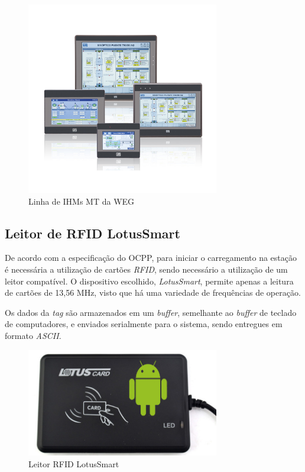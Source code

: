       \begin{figure}[H]
        \begin{center}
          \includegraphics[width=0.75\textwidth,natwidth=400,natheight=288]{assets/images/devices-hmi.jpg}
          \caption{Linha de IHMs MT da WEG}
          \label{fig:ihm}
        \end{center}
      \end{figure}

    \subsection{Leitor de RFID LotusSmart}
    \label{methodology:devices:rfid}

      De acordo com a especificação do \ac{OCPP}, para iniciar o carregamento na estação é necessária a utilização de cartões \textit{\ac{RFID}}, sendo necessário a utilização de um leitor compatível. O dispositivo escolhido, \textit{LotusSmart}, permite apenas a leitura de cartões de 13,56 MHz, visto que há uma variedade de frequências de operação.

      Os dados da \textit{tag} são armazenados em um \textit{buffer}, semelhante ao \textit{buffer} de teclado de computadores, e enviados serialmente para o sistema, sendo entregues em formato \textit{ASCII}.

      \begin{figure}[H]
        \begin{center}
          \includegraphics[width=0.75\textwidth,natwidth=655,natheight=368]{assets/images/devices-rfid.jpg}
          \caption{Leitor RFID LotusSmart}
          \label{fig:rfid}
        \end{center}
      \end{figure}

